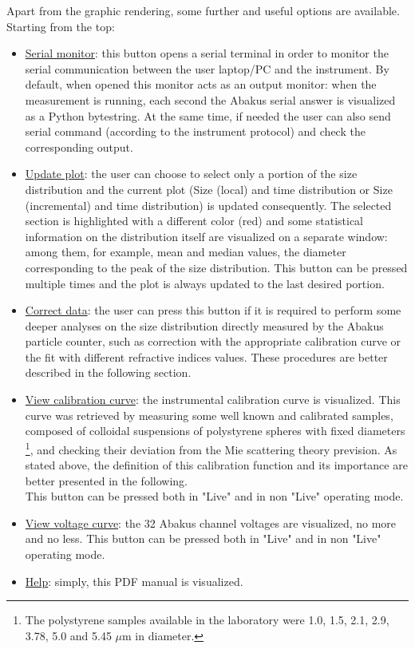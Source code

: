 \documentclass[a4paper, 11pt]{report}
\begin{document}
\newpage
Apart from the graphic rendering, some further and useful options are available. Starting from the top:
\begin{itemize}
\item \underline{Serial monitor}: this button opens a serial terminal in order to monitor the serial communication between the user laptop/PC and the instrument. By default, when opened this monitor acts as an output monitor: when the measurement is running, each second the Abakus serial answer is visualized as a Python bytestring.
At the same time, if needed the user can also send serial command (according to the instrument protocol) and check the corresponding output.
\item \underline{Update plot}: the user can choose to select only a portion of the size distribution and the current plot (Size (local) and time distribution or Size (incremental) and time distribution) is updated consequently. The selected section is highlighted with a different color (red) and some statistical information on the distribution itself are visualized on a separate window: among them, for example, mean and median values, the diameter corresponding to the peak of the size distribution.
This button can be pressed multiple times and the plot is always updated to the last desired portion.
\item \underline{Correct data}: the user can press this button if it is required to perform some deeper analyses on the size distribution directly measured by the Abakus particle counter, such as correction with the appropriate calibration curve or the fit with different refractive indices values. These procedures are better described in the following section.
\item \underline{View calibration curve}: the instrumental calibration curve is visualized. This curve was retrieved by measuring some well known and calibrated samples, composed of colloidal suspensions of polystyrene spheres with fixed diameters \footnote{The polystyrene samples available in the laboratory were 1.0, 1.5, 2.1, 2.9, 3.78, 5.0 and 5.45 $\mu$m in diameter.}, and checking their deviation from the Mie scattering theory prevision. As stated above, the definition of this calibration function and its importance are better presented in the following. \\
This button can be pressed both in "Live" and in non "Live" operating mode.
\item \underline{View voltage curve}: the 32 Abakus channel voltages are visualized, no more and no less. This button can be pressed both in "Live" and in non "Live" operating mode.
\item \underline{Help}: simply, this PDF manual is visualized.
\end{itemize}
\end{document}
